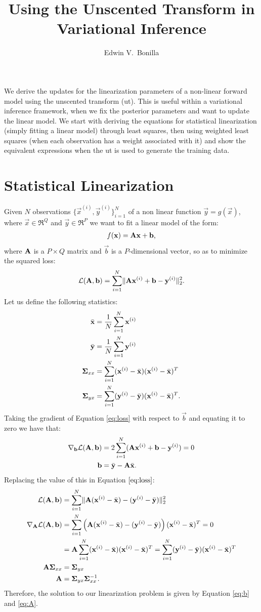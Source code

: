 \documentclass[11pt,a4paper]{article}
\title{Using the Unscented Transform in Variational Inference}
\author{Edwin V.~Bonilla}
\newcommand{\ut}{{\sc ut}\xspace}
\newcommand{\x}{\vec{x}}
\newcommand{\y}{\vec{y}}
\renewcommand{\xi}{\x^{(i)}}
\newcommand{\yi}{\y^{(i)}}
\renewcommand{\b}{\vec{b}}
\newcommand{\xbar}{\bar{\x}}
\newcommand{\ybar}{\bar{\y}}
\newcommand{\Sigmaxx}{\mat{\Sigma}_{xx}}
\newcommand{\Sigmayx}{\mat{\Sigma}_{yx}}
\newcommand{\grad}{\nabla}
\newcommand{\loss}{\calL(\A,\b)}
\renewcommand{\Q}{Q}
\renewcommand{\P}{P}
\begin{document}
\maketitle
We derive the updates for the linearization parameters of a non-linear forward model
using the unscented transform (\ut). This is useful within a variational inference framework,
when we fix the posterior parameters and want to update the linear model. 
%
We start with deriving the equations for statistical linearization (simply fitting a linear model) 
through least squares, then using weighted least squares (when each observation has a 
weight associated with it) and show the equivalent expressions when the \ut
is used to generate the training data.

\section{Statistical Linearization}
Given $N$ observations $\{ \xi, \yi\}_{i=1}^N$ of a non linear function $\y = g(\x)$, where 
$\x \in \Re^\Q$ and $\y \in \Re^\P$ we want to fit a linear model of the form:
\begin{align}
	f(\x) = \A \x + \b \text{,}
\end{align}
where $\mathbf{A}$ is a $\P \times  \Q$ matrix and $\b$ is a $\P$-dimensional vector, so as to 
minimize the squared loss:
\begin{align}
	\label{eq:loss}
	\loss = \sum_{i=1}^N \norm{\A \xi + \b - \yi }_2^2 \text{.}
\end{align}
Let us define the following statistics:
\begin{align}
	\xbar & = \frac{1}{N} \sum_{i=1}^N \xi \\
	\ybar & = \frac{1}{N} \sum_{i=1}^N \yi \\
	\Sigmaxx & = \sum_{i=1}^N (\xi - \xbar) (\xi - \xbar)^T \\
	\Sigmayx & = \sum_{i=1}^N (\yi - \ybar) (\xi - \xbar)^T \text{.}
\end{align}
Taking the gradient of Equation \eqref{eq:loss} with respect to $\b$  and equating it to zero we have that:
\begin{align}
	\grad_{\b} \loss &= 2 \sum_{i=1}^N ( \A \xi + \b - \yi )   = 0 \\
	\label{eq:b}
		\b & = \ybar - \A \xbar \text{.}
\end{align}
Replacing the value of this in Equation $\eqref{eq:loss}$:
\begin{align}
	\loss &= \sum_{i=1}^N \norm{\A (\xi  -\xbar) -  (\yi - \ybar) }_2^2 \\
	\grad_{\A} \loss & =\sum_{i=1}^N \left(\A (\xi  -\xbar) -  (\yi - \ybar) \right) (\xi  -\xbar)^T = 0 \\	
	& = \A \sum_{i=1}^N (\xi  -\xbar)  (\xi  -\xbar)^T = \sum_{i=1}^N (\yi - \ybar)  (\xi  -\xbar)^T \\
	\A \Sigmaxx & = \Sigmayx \\
		\label{eq:A}
	\A & =  \Sigmayx  \Sigmaxx^{-1} \text{.}
\end{align}
Therefore, the solution to our linearization problem is given by Equation \eqref{eq:b} and
\eqref{eq:A}. 
\end{document}
